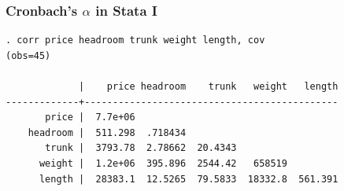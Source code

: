 

\begin{frame}[fragile]
\frametitle{Cronbach's $\alpha$ in Stata I}
\footnotesize
\begin{verbatim}
. corr price headroom trunk weight length, cov
(obs=45)

             |    price headroom    trunk   weight   length
-------------+---------------------------------------------
       price |  7.7e+06
    headroom |  511.298  .718434
       trunk |  3793.78  2.78662  20.4343
      weight |  1.2e+06  395.896  2544.42   658519
      length |  28383.1  12.5265  79.5833  18332.8  561.391

\end{verbatim}
\end{frame}

